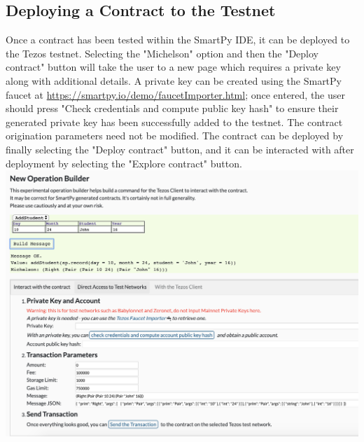 \documentclass{article}
\begin{document}
\subsection{Deploying a Contract to the Testnet}
Once a contract has been tested within the SmartPy IDE, it can be deployed to the Tezos testnet. Selecting the "Michelson" option and then the "Deploy contract" button will take the user to a new page which requires a private key along with additional details. A private key can be created using the SmartPy faucet at \url{https://smartpy.io/demo/faucetImporter.html}; once entered, the user should press "Check credentials and compute public key hash" to ensure their generated private key has been successfully added to the testnet. The contract origination parameters need not be modified. The contract can be deployed by finally selecting the "Deploy contract" button, and it can be interacted with after deployment by selecting the "Explore contract" button. \\
\includegraphics[scale=0.5]{operationbuilder}
\end{document}
